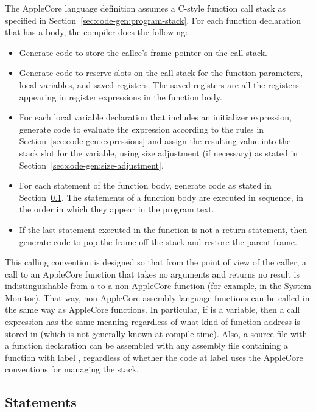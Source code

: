 \documentclass[10pt]{article}
\begin{document}
The AppleCore language definition assumes a C-style function call
stack as specified in Section~\ref{sec:code-gen:program-stack}.  For
each function declaration that has a body, the compiler does the
following:
%
\begin{itemize}
%
\item Generate code to store the callee's frame pointer on the call
  stack.
%
\item Generate code to reserve slots on the call stack for the
  function parameters, local variables, and saved registers.  The
  saved registers are all the registers appearing in register
  expressions in the function body.
%
\item For each local variable declaration that includes an initializer
  expression, generate code to evaluate the expression according to
  the rules in Section~\ref{sec:code-gen:expressions} and assign the
  resulting value into the stack slot for the variable, using size
  adjustment (if necessary) as stated in
  Section~\ref{sec:code-gen:size-adjustment}.
%
\item For each statement of the function body, generate code as stated
  in Section~\ref{sec:code-gen:statements}.  The statements of a
  function body are executed in sequence, in the order in which they
  appear in the program text.
%
\item If the last statement executed in the function is not a return
  statement, then generate code to pop the frame off the stack and
  restore the parent frame.
%
\end{itemize}
%
This calling convention is designed so that from the point of view of
the caller, a call to an AppleCore function that takes no arguments
and returns no result is indistinguishable from a  to a
non-AppleCore function (for example, in the System Monitor).  That
way, non-AppleCore assembly language functions can be called in the
same way as AppleCore functions.  In particular, if  is a
variable, then a call expression  has the same meaning
regardless of what kind of function address is stored in 
(which is not generally known at compile time).  Also, a source file
with a function declaration  can be assembled with any
assembly file containing a function with label , regardless
of whether the code at label  uses the AppleCore conventions
for managing the stack.

\subsection{Statements}
\label{sec:code-gen:statements}
\end{document}
